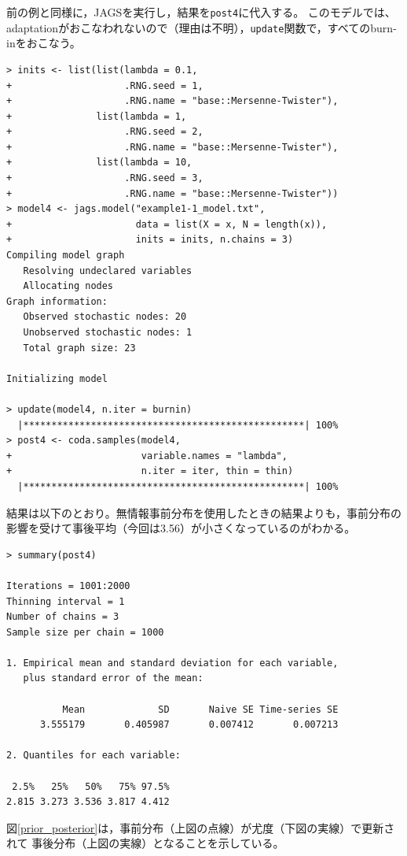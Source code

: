 \documentclass[11pt,uplatex]{jsarticle}
\begin{document}
前の例と同様に，\textsf{JAGS}を実行し，結果を\texttt{post4}に代入する。
このモデルでは、adaptationがおこなわれないので（理由は不明），\texttt{update}関数で，すべてのburn-inをおこなう。
%
\begin{lstlisting}
> inits <- list(list(lambda = 0.1,
+                    .RNG.seed = 1,
+                    .RNG.name = "base::Mersenne-Twister"),
+               list(lambda = 1,
+                    .RNG.seed = 2,
+                    .RNG.name = "base::Mersenne-Twister"),
+               list(lambda = 10,
+                    .RNG.seed = 3,
+                    .RNG.name = "base::Mersenne-Twister"))
> model4 <- jags.model("example1-1_model.txt",
+                      data = list(X = x, N = length(x)),
+                      inits = inits, n.chains = 3)
Compiling model graph
   Resolving undeclared variables
   Allocating nodes
Graph information:
   Observed stochastic nodes: 20
   Unobserved stochastic nodes: 1
   Total graph size: 23

Initializing model

> update(model4, n.iter = burnin)
  |**************************************************| 100%
> post4 <- coda.samples(model4,
+                       variable.names = "lambda",
+                       n.iter = iter, thin = thin)
  |**************************************************| 100%
\end{lstlisting}

結果は以下のとおり。無情報事前分布を使用したときの結果よりも，事前分布の
影響を受けて事後平均（今回は3.56）が小さくなっているのがわかる。

\begin{lstlisting}
> summary(post4)

Iterations = 1001:2000
Thinning interval = 1 
Number of chains = 3 
Sample size per chain = 1000 

1. Empirical mean and standard deviation for each variable,
   plus standard error of the mean:

          Mean             SD       Naive SE Time-series SE 
      3.555179       0.405987       0.007412       0.007213 

2. Quantiles for each variable:

 2.5%   25%   50%   75% 97.5% 
2.815 3.273 3.536 3.817 4.412 

\end{lstlisting}

図\ref{prior_posterior}は，事前分布（上図の点線）が尤度（下図の実線）で更新されて
事後分布（上図の実線）となることを示している。
\end{document}
